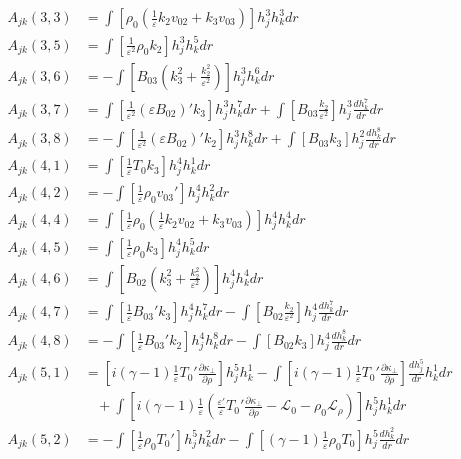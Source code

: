 \documentclass[11pt, fleqn]{article}
\newcommand{\HL}{\mathscr{L}}
\newcommand{\eps}{\varepsilon}
\begin{document}
\begin{align*}
	A_{jk}(3, 3) &=  \int \left[\rho_0\left(\frac{1}{\eps}k_2v_{02} + k_3v_{03}\right)\right] h_j^3 h_k^3 dr											\\
	A_{jk}(3, 5) &=  \int \left[\frac{1}{\eps^2}\rho_0k_2\right] h_j^3 h_k^5 dr																			\\
	A_{jk}(3, 6) &= -\int \left[B_{03}\left(k_3^2 + \frac{k_2^2}{\eps^2}\right)\right]h_j^3 h_k^6 dr													\\
	A_{jk}(3, 7) &=  \int \left[\frac{1}{\eps^2}(\eps B_{02})'k_3\right] h_j^3 h_k^7 dr  +  \int \left[ B_{03}\frac{k_2}{\eps^2}\right] h_j^3 \frac{dh_k^7}{dr} dr	\\
	A_{jk}(3, 8) &= -\int \left[\frac{1}{\eps^2}(\eps B_{02})'k_2\right] h_j^3 h_k^8 dr  +  \int \left[ B_{03}k_3\right]h_j^2 \frac{dh_k^8}{dr} dr		\\
	A_{jk}(4, 1) &=  \int \left[\frac{1}{\eps}T_0k_3\right] h_j^4 h_k^1 dr																				\\
	A_{jk}(4, 2) &= -\int \left[\frac{1}{\eps}\rho_0v_{03}'\right] h_j^4 h_k^2 dr																		\\
	A_{jk}(4, 4) &=  \int \left[\frac{1}{\eps}\rho_0\left(\frac{1}{\eps}k_2v_{02} + k_3v_{03}\right)\right] h_j^4 h_k^4 dr								\\
	A_{jk}(4, 5) &=  \int \left[\frac{1}{\eps}\rho_0k_3\right] h_j^4 h_k^5 dr																			\\
	A_{jk}(4, 6) &=  \int \left[B_{02}\left(k_3^2 + \frac{k_2^2}{\eps^2}\right)\right] h_j^4 h_k^4 dr													\\
	A_{jk}(4, 7) &=  \int \left[\frac{1}{\eps}B_{03}'k_3\right] h_j^4 h_k^7 dr - \int \left[B_{02}\frac{k_2}{\eps^2}\right] h_j^4 \frac{dh_k^7}{dr}dr   \\
	A_{jk}(4, 8) &= -\int \left[\frac{1}{\eps}B_{03}'k_2\right] h_j^4 h_k^8 dr - \int \left[B_{02}k_3\right] h_j^4 \frac{dh_k^8}{dr} dr					\\
	A_{jk}(5, 1) &=  \left[i(\gamma - 1)\frac{1}{\eps}T_0'\frac{\partial \kappa_\bot}{\partial \rho}\right] h_j^5 h_k^1 - \int \left[i(\gamma - 1)\frac{1}{\eps}T_0'\frac{\partial \kappa_\bot}{\partial \rho}\right] \frac{dh_j^5}{dr} h_k^1 dr		\\
				 &~~~~ +\int \left[i(\gamma - 1)\frac{1}{\eps}\left(\frac{\eps'}{\eps}T_0'\frac{\partial \kappa_\bot}{\partial \rho} - \HL_0 - \rho_0\HL_\rho\right)\right] h_j^5h_k^1 dr																\\
	A_{jk}(5, 2) &= -\int \left[\frac{1}{\eps}\rho_0T_0'\right] h_j^5h_k^2 dr - \int \left[(\gamma - 1)\frac{1}{\eps}\rho_0T_0\right] h_j^5\frac{dh_k^2}{dr} dr	\\

\end{align*}
\end{document}
